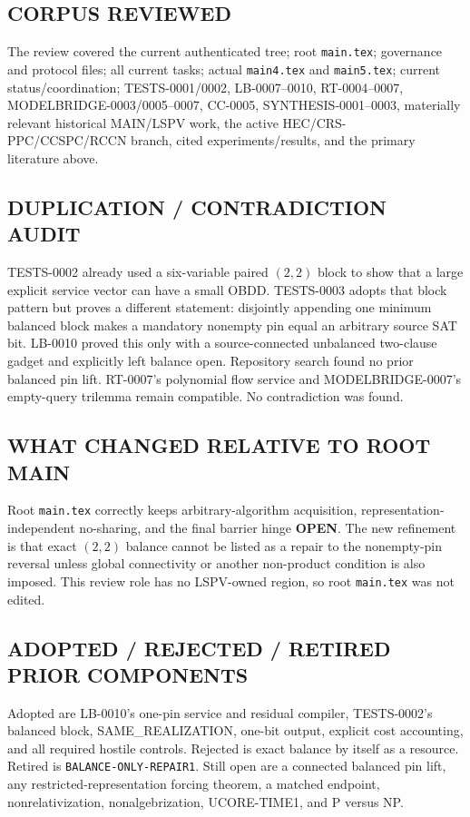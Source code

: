 \documentclass[11pt]{article}
\newcommand{\OPEN}{\textbf{OPEN}}
\begin{document}
\subsection*{CORPUS REVIEWED}
The review covered the current authenticated tree; root \texttt{main.tex};
governance and protocol files; all current tasks; actual \texttt{main4.tex}
and \texttt{main5.tex}; current status/coordination; TESTS-0001/0002,
LB-0007--0010, RT-0004--0007, MODELBRIDGE-0003/0005--0007, CC-0005,
SYNTHESIS-0001--0003, materially relevant historical MAIN/LSPV work, the
active HEC/CRS-PPC/CCSPC/RCCN branch, cited experiments/results, and the
primary literature above.

\subsection*{DUPLICATION / CONTRADICTION AUDIT}
TESTS-0002 already used a six-variable paired $(2,2)$ block to show that a
large explicit service vector can have a small OBDD.  TESTS-0003 adopts that
block pattern but proves a different statement: disjointly appending one
minimum balanced block makes a mandatory nonempty pin equal an arbitrary
source SAT bit.  LB-0010 proved this only with a source-connected unbalanced
two-clause gadget and explicitly left balance open.  Repository search found
no prior balanced pin lift.  RT-0007's polynomial flow service and
MODELBRIDGE-0007's empty-query trilemma remain compatible.  No contradiction
was found.

\subsection*{WHAT CHANGED RELATIVE TO ROOT MAIN}
Root \texttt{main.tex} correctly keeps arbitrary-algorithm acquisition,
representation-independent no-sharing, and the final barrier hinge \OPEN.
The new refinement is that exact $(2,2)$ balance cannot be listed as a repair
to the nonempty-pin reversal unless global connectivity or another
non-product condition is also imposed.  This review role has no LSPV-owned
region, so root \texttt{main.tex} was not edited.

\subsection*{ADOPTED / REJECTED / RETIRED PRIOR COMPONENTS}
Adopted are LB-0010's one-pin service and residual compiler, TESTS-0002's
balanced block, SAME\_REALIZATION, one-bit output, explicit cost accounting,
and all required hostile controls.  Rejected is exact balance by itself as a
resource.  Retired is \texttt{BALANCE-ONLY-REPAIR1}.  Still open are a
connected balanced pin lift, any restricted-representation forcing theorem,
a matched endpoint, nonrelativization, nonalgebrization, UCORE-TIME1, and P
versus NP.
\end{document}
